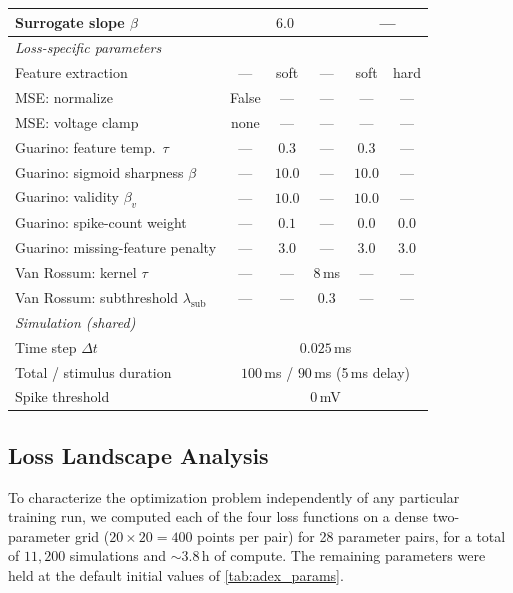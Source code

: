 \begin{table}[h]
\begin{tabular}{lccccc}
Surrogate slope $\beta$   & \multicolumn{3}{c}{$6.0$}                                     & \multicolumn{2}{c}{---} \\
\midrule
\multicolumn{6}{l}{\textit{Loss-specific parameters}} \\
Feature extraction        & ---   & soft    & ---     & soft    & hard \\
MSE: normalize            & False & ---     & ---     & ---     & --- \\
MSE: voltage clamp        & none  & ---     & ---     & ---     & --- \\
Guarino: feature temp.\ $\tau$ & --- & $0.3$ & ---   & $0.3$   & --- \\
Guarino: sigmoid sharpness $\beta$ & --- & $10.0$ & --- & $10.0$ & --- \\
Guarino: validity $\beta_v$ & --- & $10.0$ & ---    & $10.0$  & --- \\
Guarino: spike-count weight & --- & $0.1$ & ---     & $0.0$   & $0.0$ \\
Guarino: missing-feature penalty & --- & $3.0$ & --- & $3.0$  & $3.0$ \\
Van Rossum: kernel $\tau$ & ---   & ---     & $8$\,ms & ---   & --- \\
Van Rossum: subthreshold $\lambda_{\text{sub}}$ & --- & --- & $0.3$ & --- & --- \\
\midrule
\multicolumn{6}{l}{\textit{Simulation (shared)}} \\
Time step $\Delta t$       & \multicolumn{5}{c}{$0.025$\,ms} \\
Total / stimulus duration & \multicolumn{5}{c}{$100\,$ms / $90\,$ms (5\,ms delay)} \\
Spike threshold            & \multicolumn{5}{c}{$0$\,mV} \\
\bottomrule
\end{tabular}
\end{table}

\subsection{Loss Landscape Analysis}\label{sec:app:loss}
To characterize the optimization problem independently of any particular training run, we computed each of the four loss functions on a dense two-parameter grid ($20 \times 20 = 400$ points per pair) for 28 parameter pairs, for a total of $11{,}200$ simulations and $\sim$3.8\,h of compute.
The remaining parameters were held at the default initial values of \cref{tab:adex_params}.

